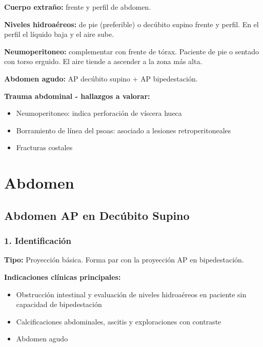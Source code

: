 	\textbf{Cuerpo extraño:} frente y perfil de abdomen.
	
	\textbf{Niveles hidroaéreos:} de pie (preferible) o decúbito supino frente y perfil. En el perfil el líquido baja y el aire sube.
	
	\textbf{Neumoperitoneo:} complementar con frente de tórax. Paciente de pie o sentado con torso erguido. El aire tiende a ascender a la zona más alta.
	
	\textbf{Abdomen agudo:} AP decúbito supino + AP bipedestación.
	
	\textbf{Trauma abdominal - hallazgos a valorar:}
	\begin{itemize}
		\item Neumoperitoneo: indica perforación de víscera hueca
		\item Borramiento de línea del psoas: asociado a lesiones retroperitoneales
		\item Fracturas costales
	\end{itemize}
	
	
	\clearpage
	
	
	\section{Abdomen}
	
	\subsection{Abdomen AP en Decúbito Supino}
	
	\subsubsection*{1. Identificación}
	
	\textbf{Tipo:} Proyección básica. Forma par con la proyección AP en bipedestación.
	
	\textbf{Indicaciones clínicas principales:}
	\begin{itemize}
		\item Obstrucción intestinal y evaluación de niveles hidroaéreos en paciente sin capacidad de bipedestación
		\item Calcificaciones abdominales, ascitis y exploraciones con contraste
		\item Abdomen agudo
	\end{itemize}
	
